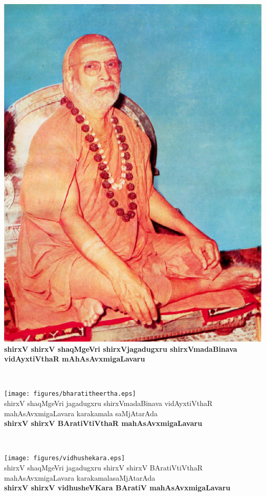 \begin{center}
\vfill
\thispagestyle{empty}
\includegraphics{figures/abhinava_v_t.eps}\\
{\bf shirxV shirxV shaqMgeVri shirxVjagadugxru shirxVmadaBinava\\ vidAyxtiVthaR mAhAsAvxmigaLavaru}
\vfill
\end{center}
\newpage
~\thispagestyle{empty}
\newpage
\begin{center}
\vfill
\thispagestyle{empty}
\texttt{[image: figures/bharatitheertha.eps]}\\
shirxV shaqMgeVri jagadugxru  shirxVmadaBinava vidAyxtiVthaR\\ mahAsAvxmigaLavara karakamala saMjAtarAda\\ 
{\bf shirxV shirxV BAratiVtiVthaR mahAsAvxmigaLavaru}
\vfill
\end{center}
\newpage
~\thispagestyle{empty}
\newpage
\begin{center}
\vfill
\thispagestyle{empty}
\texttt{[image: figures/vidhushekara.eps]}\\
shirxV shaqMgeVri jagadugxru shirxV shirxV BAratiVtiVthaR\\ mahAsAvxmigaLavara karakamalasaMjAtarAda\\ 
{\bf shirxV shirxV vidhusheVKara BAratiV mahAsAvxmigaLavaru}
\vfill
\end{center}
